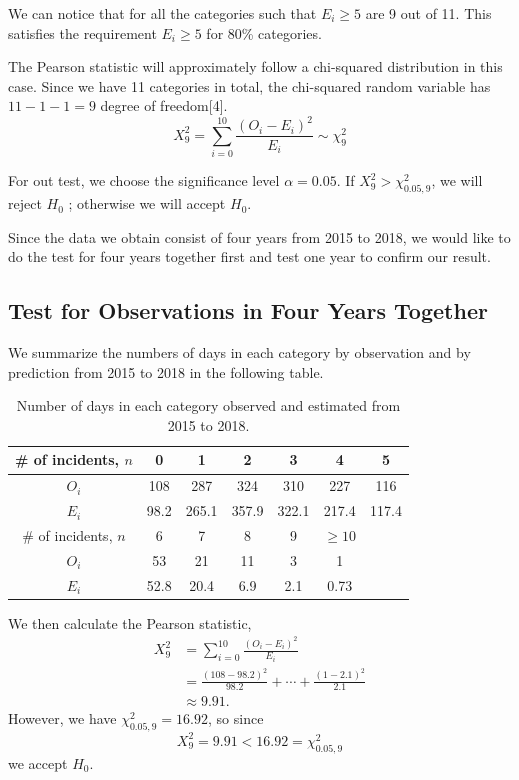 \documentclass[11pt,a4paper,english]{article}
\begin{document}
We can notice that for all the categories such that $E_{i} \geq 5$ are 9 out of 11. This satisfies the requirement $E_{i} \geq 5$ for 80\% categories.

The Pearson statistic will approximately follow a chi-squared distribution in this case. Since we have 11 categories in total, the chi-squared random variable has $11-1-1 = 9$ degree of freedom[4].
\[X^{2}_{9} = \sum_{i = 0}^{10}
\frac{(O_{i}-E_{i})^{2}}{E_{i}} \sim \chi_{9}^{2}\]

For out test, we choose the significance level $\alpha = 0.05$. If $X^{2}_{9} > \chi_{0.05,9}^{2}$, we will reject $H_{0}$ ; otherwise we will accept $H_{0}$.

Since the data we obtain consist of four years from 2015 to 2018, we would like to do the test for four years together first and test one year to confirm our result. 

\subsection{Test for Observations in Four Years Together}
We summarize the numbers of days in each category by observation and by prediction from 2015 to 2018 in the following table.
\begin{table}[htbp]
    \centering
	\begin{tabular}{c|cccccc}
		\hline
        \# of incidents, $n$ & 0 & 1 & 2 & 3 & 4 & 5 \\
		\hline
		$O_{i}$ & 108 & 287 & 324 & 310 & 227 & 116\\
		\hline
		$E_{i}$ & 98.2 & 265.1 & 357.9 & 322.1 & 217.4 & 117.4\\ 
		\hline
		\hline
		\# of incidents, $n$ & 6 & 7 & 8 & 9 & $\geq 10$ & \\
		\hline
		$O_{i}$ & 53 & 21 & 11 & 3 & 1 &\\
		\hline
		$E_{i}$  & 52.8 & 20.4 & 6.9 & 2.1 & 0.73 & \\ 
		\hline 
    \end{tabular}
	\caption{Number of days in each category observed and estimated from 2015 to 2018.}
\end{table}

We then calculate the Pearson statistic,
\[
	\begin{aligned}
		X_{9}^{2} &= \sum_{i = 0}^{10}\frac{(O_{i}-E_{i})^{2}}{E_{i}}\\
		&= \frac{(108-98.2)^{2}}{98.2}+\cdots+\frac{(1-2.1)^{2}}{2.1}\\
		&\approx 9.91.
	\end{aligned}
\] 
However, we have $\chi^{2}_{0.05,9} = 16.92$, so since 
\[X_{9}^{2} = 9.91 < 16.92 = \chi_{0.05,9}^{2}\]
we accept $H_{0}$.
\end{document}
